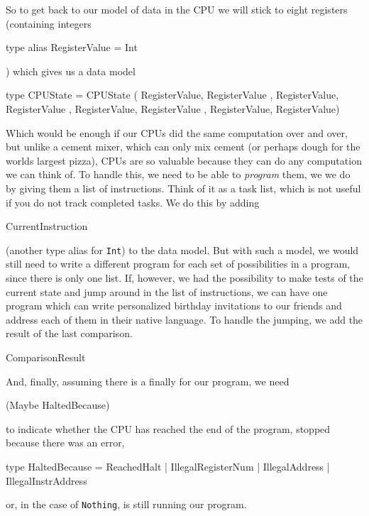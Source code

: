 \documentclass[12pt]{amsbook}
\begin{document}
{\medskip
So to get back to our model of data in the CPU
we will stick to eight registers (containing integers
\begin{code}
type alias RegisterValue = Int
\end{code}                          
) which gives us a data model
\begin{code}
type CPUState = CPUState  ( RegisterValue, RegisterValue
                          , RegisterValue, RegisterValue
                          , RegisterValue, RegisterValue
                          , RegisterValue, RegisterValue)
\end{code}
Which would be enough if our CPUs did the same computation over and over,
but unlike a cement mixer, which can only mix cement (or perhaps dough for the worlds largest pizza),
CPUs are so valuable because they can do any computation we can think of.
To handle this, we need to be able to \emph{program} them,
we we do by giving them a list of instructions.
Think of it as a task list,
which is not useful if you do not track completed tasks.
We do this by adding
\begin{code}
                          CurrentInstruction
\end{code}
(another type alias for \texttt{Int})
to the data model.
But with such a model,
we would still need to write a different program for each set of possibilities in a program, since there is only one list.
If, however, we had the possibility to make tests of the current state and jump around in the list of instructions,
we can have one program which can write personalized birthday invitations to our friends and address each of them in their native language.
To handle the jumping, we add the result of the last comparison. 
\begin{code}
                          ComparisonResult
\end{code}
And, finally, assuming there is a finally for our program,
we need 
\begin{code}
                          (Maybe HaltedBecause)
\end{code}
to indicate whether the CPU has reached the end of the program,
stopped because there was an error, 
\begin{code}
type HaltedBecause  = ReachedHalt
                    | IllegalRegisterNum
                    | IllegalAddress
                    | IllegalInstrAddress
\end{code}
or, in the case of \texttt{Nothing}, is still running our program.

}
\end{document}
